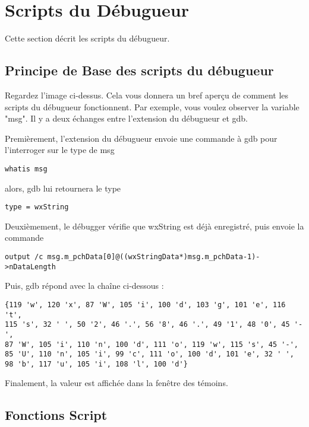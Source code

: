 \section{Scripts du Débugueur}\label{sec:debugger_scripts}
Cette section décrit les scripts du débugueur.
\subsection{Principe de Base des scripts du débugueur}


Regardez l'image ci-dessus. Cela vous donnera un bref aperçu de comment les scripts du débugueur fonctionnent. Par exemple, vous voulez observer la variable "msg". Il y a deux échanges entre l'extension du débugueur et gdb.

Premièrement, l'extension du débugueur envoie une commande à gdb pour l'interroger sur le type de msg

\begin{lstlisting}
whatis msg
\end{lstlisting}

alors, gdb lui retournera le type

\begin{lstlisting}
type = wxString
\end{lstlisting}

Deuxièmement, le débugger vérifie que wxString est déjà enregistré, puis envoie la commande

\begin{lstlisting}
output /c msg.m_pchData[0]@((wxStringData*)msg.m_pchData-1)->nDataLength
\end{lstlisting}

Puis, gdb répond avec la chaîne ci-dessous :

\begin{lstlisting}
{119 'w', 120 'x', 87 'W', 105 'i', 100 'd', 103 'g', 101 'e', 116 't', 
115 's', 32 ' ', 50 '2', 46 '.', 56 '8', 46 '.', 49 '1', 48 '0', 45 '-', 
87 'W', 105 'i', 110 'n', 100 'd', 111 'o', 119 'w', 115 's', 45 '-', 
85 'U', 110 'n', 105 'i', 99 'c', 111 'o', 100 'd', 101 'e', 32 ' ', 
98 'b', 117 'u', 105 'i', 108 'l', 100 'd'}
\end{lstlisting}

Finalement, la valeur est affichée dans la fenêtre des témoins.

\subsection{Fonctions Script}

